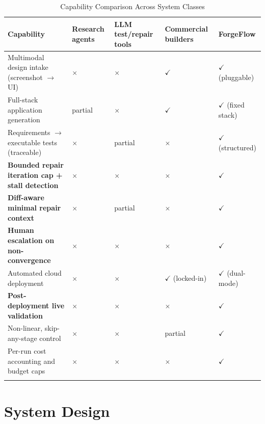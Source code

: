 \documentclass[pdflatex,sn-mathphys-num]{sn-jnl}%
\theoremstyle{thmstyleone}%
\theoremstyle{thmstyletwo}%
\theoremstyle{thmstylethree}%
\begin{document}
\begin{table}[t]
\caption{Capability Comparison Across System Classes}\label{tab1}%
\footnotesize
\begin{tabular*}{\textwidth}{@{\extracolsep\fill}p{3.8cm}p{1.3cm}p{1.7cm}p{1.7cm}p{1.9cm}@{}}
\toprule
\raggedright{}\textbf{Capability} & \centering{}\textbf{Research agents \cite{r12jiang,r13xia,r14bouzenia}} & \centering{}\textbf{LLM test/repair tools \cite{r15huang,r16ouedraogo,r17shang,r18alian,r19gu}} & \centering{}\textbf{Commercial builders \cite{r02ge}} & \centering{}\textbf{ForgeFlow}\tabularnewline
\midrule
\raggedright{}Multimodal design intake (screenshot $\rightarrow$ UI) & \centering{}$\times$ & \centering{}$\times$ & \centering{}$\checkmark$ & \centering{}$\checkmark$ (pluggable)\tabularnewline
\raggedright{}Full-stack application generation & \centering{}partial & \centering{}$\times$ & \centering{}$\checkmark$ & \centering{}$\checkmark$ (fixed stack)\tabularnewline
\raggedright{}Requirements $\rightarrow$ executable tests (traceable) & \centering{}$\times$ & \centering{}partial & \centering{}$\times$ & \centering{}$\checkmark$ (structured)\tabularnewline
\raggedright{}\textbf{Bounded repair iteration cap + stall detection} & \centering{}$\times$ & \centering{}$\times$ & \centering{}$\times$ & \centering{}$\pmb{\checkmark}$\tabularnewline
\raggedright{}\textbf{Diff-aware minimal repair context} & \centering{}$\times$ & \centering{}partial & \centering{}$\times$ & \centering{}$\pmb{\checkmark}$\tabularnewline
\raggedright{}\textbf{Human escalation on non-convergence} & \centering{}$\times$ & \centering{}$\times$ & \centering{}$\times$ & \centering{}$\pmb{\checkmark}$\tabularnewline
\raggedright{}Automated cloud deployment & \centering{}$\times$ & \centering{}$\times$ & \centering{}$\checkmark$ (locked-in) & \centering{}$\checkmark$ (dual-mode)\tabularnewline
\raggedright{}\textbf{Post-deployment live validation} & \centering{}$\times$ & \centering{}$\times$ & \centering{}$\times$ & \centering{}$\pmb{\checkmark}$\tabularnewline
\raggedright{}Non-linear, skip-any-stage control & \centering{}$\times$ & \centering{}$\times$ & \centering{}partial & \centering{}$\checkmark$\tabularnewline
\raggedright{}Per-run cost accounting and budget caps & \centering{}$\times$ & \centering{}$\times$ & \centering{}$\times$ & \centering{}$\checkmark$\tabularnewline
\botrule
\end{tabular*}
\end{table}

\section{System Design}\label{sec3}
\end{document}
